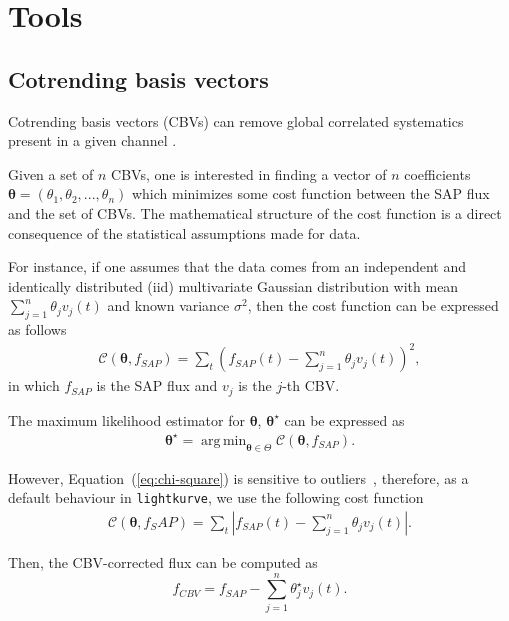 \documentclass[twocolumn]{aastex62}
\newcommand{\lightkurve}{\texttt{lightkurve}}
\DeclareMathOperator*{\argmin}{arg\,min}
\begin{document}
\section{Tools}

\subsection{Cotrending basis vectors}

Cotrending basis vectors (CBVs) can remove global correlated
systematics present in a given channel \cite{smith2012}.

Given a set of $n$ CBVs, one is interested in finding a vector of $n$
coefficients $\bm{\theta}=(\theta_1, \theta_2, ..., \theta_n)$ which minimizes
some cost function between the SAP flux and the set of CBVs. The mathematical
structure of the cost function is a direct consequence of the statistical
assumptions made for data.

For instance, if one assumes that the data comes from an independent and
identically distributed (iid) multivariate Gaussian distribution with mean
$\sum_{j=1}^{n}\theta_j v_{j}(t)$ and known variance $\sigma^2$, then the
cost function can be expressed as follows
\begin{align}
    \mathcal{C}(\bm{\theta}, f_{SAP}) = \sum_{t}\left(f_{SAP}(t)
    - \sum_{j=1}^{n}\theta_j v_{j}(t)\right)^2,
\label{eq:chi-square}
\end{align}
in which $f_{SAP}$ is the SAP flux and $v_j$ is the $j$-th CBV.

The maximum likelihood estimator for $\bm{\theta}$, $\bm{\theta^{\star}}$ can be
expressed as
\begin{align}
    \bm{\theta}^{\star} = \argmin_{\bm{\theta} \in \Theta} \mathcal{C}(\bm{\theta}, f_{SAP}).
\end{align}

However, Equation~(\ref{eq:chi-square}) is sensitive to outliers~\cite{ivezi2014},
therefore, as a default behaviour in \lightkurve, we use the following cost
function
\begin{align}
    \mathcal{C}(\bm{\theta}, f_SAP) = \sum_{t} \left\rvert f_{SAP}(t)
    - \sum_{j=1}^{n}\theta_j v_{j}(t)\right\rvert.
\label{eq:l1-norm}
\end{align}


Then, the CBV-corrected flux can be computed as
\begin{equation}
    f_{CBV} = f_{SAP} - \sum_{j=1}^{n}\theta^{\star}_j v_{j}(t).
\end{equation}
\end{document}
